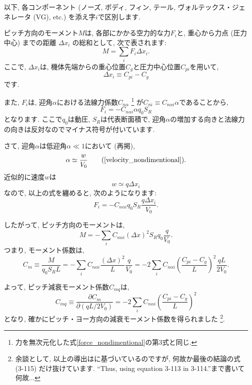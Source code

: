 \documentclass[uplatex,dvipdfmx,a4j,11  pt]{jsarticle}
\begin{document}
\enskip

以下, 各コンポーネント (ノーズ, ボディ, フィン, テール, ヴォルテックス・ジェネレータ (VG), etc.) を添え字$i$で区別します.

ピッチ方向のモーメント$M$は, 各部にかかる空力的な力$F_i$と, 重心から力点 (圧力中心) までの距離 $\Delta x_i$ の総和として, 次で表されます:
\begin{equation}
  M = \sum_i F_i \Delta x_i.
\end{equation}
ここで, $\Delta x_i$は, 機体先端からの重心位置$C_g$と圧力中心位置$C_{pi}$を用いて,
\begin{equation}
  \Delta x_i \equiv C_{pi} - C_g 
\end{equation}
です.

また, $F_i$は, 迎角$\alpha$における法線力係数$C_{n\alpha}$
\footnote{力を無次元化した式\eqref{force_nondimentional}の第3式と同じ.}
が$C_{n i} \equiv C_{n\alpha i} \alpha$であることから, 
\begin{equation}
  F_i = - C_{n\alpha i} \alpha q_0 S_R
\end{equation}
となります.
ここで$q_0$は動圧, $S_R$は代表断面積で, 迎角$\alpha$の増加する向きと法線力の向きは反対なのでマイナス符号が付いています.

さて, 迎角$\alpha$は低迎角$\alpha \ll 1$において (再掲), 
\begin{equation}
  \alpha \simeq \frac{w}{V_0} \tag{\ref{velocity_nondimentional}}.
\end{equation}
近似的に速度$w$は
\begin{equation}
  w \simeq q \Delta x_i
\end{equation}
なので, 以上の式を纏めると, 次のようになります:
\begin{equation}
  F_i = - C_{n\alpha i} q_0 S_R\frac{q\Delta x_i}{V_0}.
\end{equation}

したがって, ピッチ方向のモーメントは,
\begin{equation}
  M = -\sum_i C_{n\alpha i} (\Delta x)^2 S_R q_0 \frac{q}{V_0}.
\end{equation}
つまり, モーメント係数は,
\begin{equation}
  C_{m} \equiv \frac{M}{q_0 S_R L} = - \sum_i C_{n\alpha i} \frac{(\Delta x)^2}{L} \frac{q}{V_0} = - 2\sum_i C_{n\alpha i} \left(\frac{C_{pi} - C_g}{L}\right)^2 \frac{q L}{2V_0}.
\end{equation}

よって, ピッチ減衰モーメント係数$C_{mq}$は,
\begin{equation}
  C_{mq} \equiv \frac{\partial C_m}{\partial (qL/2V_0)} = - 2\sum_i C_{n\alpha i} \left(\frac{C_{pi} - C_g}{L}\right)^2
\end{equation}
となり, 確かにピッチ・ヨー方向の減衰モーメント係数を得られました
\footnote{余談として, 以上の導出は\cite{barrowman}に基づいているのですが, 何故か最後の結論の式 (3-115) だけ抜けています. ``Thus, using equation 3-113 in 3-114.''まで書いて何故...}.
\end{document}
